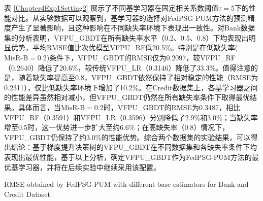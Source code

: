 表 \ref{Chapter4Exp1Setting2} 展示了不同基学习器在固定相关系数阈值$\tau=5$下的性能对比。从实验数据可以观察到，基学习器的选择对FedPSG-PUM方法的预测精度产生了显著影响，且这种影响在不同缺失率环境下表现出一致性。对Bank数据集的分析表明，VFPU\_GBDT在所有缺失率水平（0.2、0.5、0.8）下均表现出明显优势，平均RMSE值比次优模型VFPU\_RF低20.5\%。特别是在低缺失率($\text{MisR-B}=0.2$)条件下，VFPU\_GBDT的RMSE仅为0.2097，较VFPU\_RF（0.2640）降低了20.6\%，较传统VFPU\_LR（0.3146）降低了33.3\%。值得注意的是，随着缺失率提高至0.8，VFPU\_GBDT依然保持了相对稳定的性能（RMSE为0.2311），仅比低缺失率环境下增加了10.2\%。在Credit数据集上，各基学习器之间的性能差异虽然相对减小，但VFPU\_GBDT仍然在所有缺失率条件下取得最优结果。具体而言，当$\text{MisR-B}=0.2$时，VFPU\_GBDT的RMSE为0.3487，相比VFPU\_RF（0.3591）和VFPU\_LR（0.3596）分别降低了2.9\%和3.0\%；当缺失率增至0.5时，这一优势进一步扩大至约6.6\%；在高缺失率（0.8）情况下，VFPU\_GBDT仍保持了约3.0\%的性能优势。综合两个数据集的实验结果，可以得出结论：基于梯度提升决策树的VFPU\_GBDT在不同数据集和各缺失率条件下均表现出最优性能，基于以上分析，确定VFPU\_GBDT作为FedPSG-PUM方法的最优基学习器，并将在后续实验中继续采用该配置。

\begin{table}[!h]
	\centering
	{\wuhao  RMSE obtained by FedPSG-PUM with different base estimators for Bank and Credit Dataset}
	\label{Chapter4Exp1Setting2}
\end{table}


